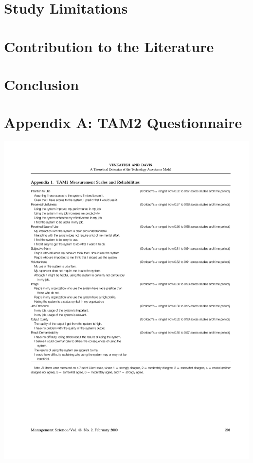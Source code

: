 \documentclass[12pt]{memoir}
\begin{document}
\chapter{Study Limitations}


\chapter{Contribution to the Literature}


\chapter{Conclusion}


\printglossary*[nonumberlist]

\newpage



\appendix

\clearpage
\chapter{Appendix A: TAM2 Questionnaire}
\includegraphics[trim={25mm 60mm 10mm 0mm}]{pdf/TAM2.pdf}
\end{document}
